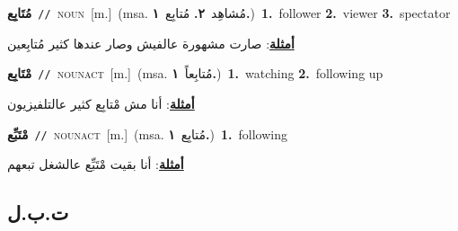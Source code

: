 \documentclass[10pt,a4paper,twoside]{article} %
\begin{document}
\begin{multicols}{2}
{{\setlength\topsep{0pt}\textbf{\foreignlanguage{arabic}{مُتَابِع}}\ {\color{gray}\texttt{//}\color{black}}\ \textsc{noun}\ [m.]\ \color{gray}(msa. \foreignlanguage{arabic}{مُشاهِد}~\foreignlanguage{arabic}{\textbf{٢.}}  \foreignlanguage{arabic}{مُتابِع}~\foreignlanguage{arabic}{\textbf{١.}})\color{black}\ \textbf{1.}~follower  \textbf{2.}~viewer  \textbf{3.}~spectator\  \begin{flushright}\color{gray}\foreignlanguage{arabic}{\textbf{\underline{\foreignlanguage{arabic}{أمثلة}}}: صارت مشهورة عالفيش وصار عندها كثير مُتابِعين}\end{flushright}\color{black}} \vspace{2mm}

{\setlength\topsep{0pt}\textbf{\foreignlanguage{arabic}{مْتَابِع}}\ {\color{gray}\texttt{//}\color{black}}\ \textsc{noun\textunderscore act}\ [m.]\ \color{gray}(msa. \foreignlanguage{arabic}{مُتابِعاً}~\foreignlanguage{arabic}{\textbf{١.}})\color{black}\ \textbf{1.}~watching  \textbf{2.}~following up\  \begin{flushright}\color{gray}\foreignlanguage{arabic}{\textbf{\underline{\foreignlanguage{arabic}{أمثلة}}}: أنا مش مْتابِع كثير عالتلفيزيون}\end{flushright}\color{black}} \vspace{2mm}

{\setlength\topsep{0pt}\textbf{\foreignlanguage{arabic}{مْتَبِّع}}\ {\color{gray}\texttt{//}\color{black}}\ \textsc{noun\textunderscore act}\ [m.]\ \color{gray}(msa. \foreignlanguage{arabic}{مُتابِع}~\foreignlanguage{arabic}{\textbf{١.}})\color{black}\ \textbf{1.}~following\  \begin{flushright}\color{gray}\foreignlanguage{arabic}{\textbf{\underline{\foreignlanguage{arabic}{أمثلة}}}: أنا بقيت مْتَبِّع عالشغل تبعهم}\end{flushright}\color{black}} \vspace{2mm}

\vspace{-3mm}
\subsection*{\color{blue}\foreignlanguage{arabic}{ت.ب.ل}\color{blue}{}} 

}
\end{multicols}
\end{document}
